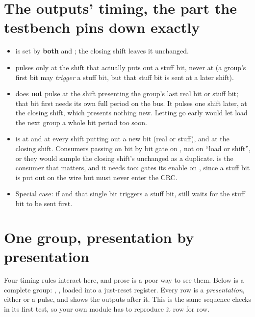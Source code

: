 \section{The outputs' timing, the part the testbench pins down exactly}
\label{c14:sec:timing}

\begin{itemize}
  \item {} is set by \textbf{both}  and ; the closing shift leaves
    it unchanged.
  \item {} pulses only at the shift that actually puts out a stuff bit, never at
     (a group's first bit may \emph{trigger} a stuff bit, but that stuff bit is sent at a
    later shift).
  \item {} does \textbf{not} pulse at the shift presenting the group's last real bit or
    stuff bit; that bit first needs its own full period on the bus. It pulses one shift later, at the
    closing shift, which presents nothing new. Letting  go early would let
     load the next group a whole bit period too soon.
  \item {} is  at  and at every shift putting out a new bit (real
    or stuff), and  at the closing shift. Consumers passing  on bit by bit
    gate on , not on ``load or shift'', or they would sample the closing shift's
    unchanged  as a duplicate.  is the consumer that matters, and it needs
     too:  gates its enable on , since a
    stuff bit is put out on the wire but must never enter the CRC.
  \item Special case: if  and that single bit triggers a stuff bit, 
    still waits for the stuff bit to be sent first.
\end{itemize}

\section{One group, presentation by presentation}
\label{c14:sec:trace}

Four timing rules interact here, and prose is a poor way to see them. Below is a complete group:
, , loaded into a just-reset register. Every row is a
\emph{presentation}, either  or a  pulse, and shows the outputs after it. This
is the same sequence  checks in its first test, so your own module has to
reproduce it row for row.

